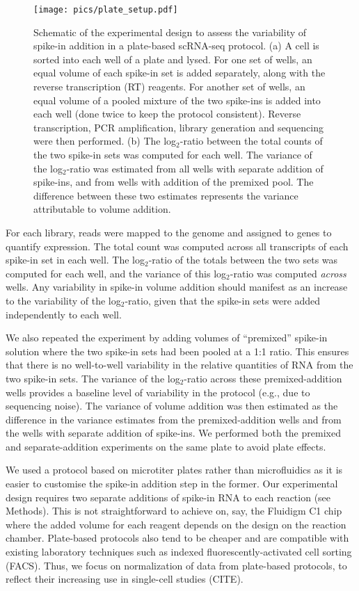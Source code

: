 \documentclass{article}
\begin{document}
\begin{figure}[tbp]
\begin{center}
\texttt{[image: pics/plate\_setup.pdf]}
\end{center}
\caption{Schematic of the experimental design to assess the variability of spike-in addition in a plate-based scRNA-seq protocol.
(a) A cell is sorted into each well of a plate and lysed.
For one set of wells, an equal volume of each spike-in set is added separately, along with the reverse transcription (RT) reagents.
For another set of wells, an equal volume of a pooled mixture of the two spike-ins is added into each well (done twice to keep the protocol consistent).
Reverse transcription, PCR amplification, library generation and sequencing were then performed.
(b) The log$_2$-ratio between the total counts of the two spike-in sets was computed for each well.
The variance of the log$_2$-ratio was estimated from all wells with separate addition of spike-ins, and from wells with addition of the premixed pool.
The difference between these two estimates represents the variance attributable to volume addition.
}
\label{fig:expdesign}
\end{figure}

For each library, reads were mapped to the genome and assigned to genes to quantify expression.
The total count was computed across all transcripts of each spike-in set in each well.
The log$_2$-ratio of the totals between the two sets was computed for each well, and the variance of this log$_2$-ratio was computed \textit{across} wells.
Any variability in spike-in volume addition should manifest as an increase to the variability of the log$_2$-ratio, given that the spike-in sets were added independently to each well.

We also repeated the experiment by adding volumes of ``premixed'' spike-in solution where the two spike-in sets had been pooled at a 1:1 ratio.
This ensures that there is no well-to-well variability in the relative quantities of RNA from the two spike-in sets.
The variance of the log$_2$-ratio across these premixed-addition wells provides a baseline level of variability in the protocol (e.g., due to sequencing noise).
The variance of volume addition was then estimated as the difference in the variance estimates from the premixed-addition wells and from the wells with separate addition of spike-ins.
We performed both the premixed and separate-addition experiments on the same plate to avoid plate effects.

We used a protocol based on microtiter plates rather than microfluidics as it is easier to customise the spike-in addition step in the former.
Our experimental design requires two separate additions of spike-in RNA to each reaction (see Methods).
This is not straightforward to achieve on, say, the Fluidigm C1 chip where the added volume for each reagent depends on the design on the reaction chamber.
Plate-based protocols also tend to be cheaper and are compatible with existing laboratory techniques such as indexed fluorescently-activated cell sorting (FACS).
Thus, we focus on normalization of data from plate-based protocols, to reflect their increasing use in single-cell studies (CITE).
\end{document}
